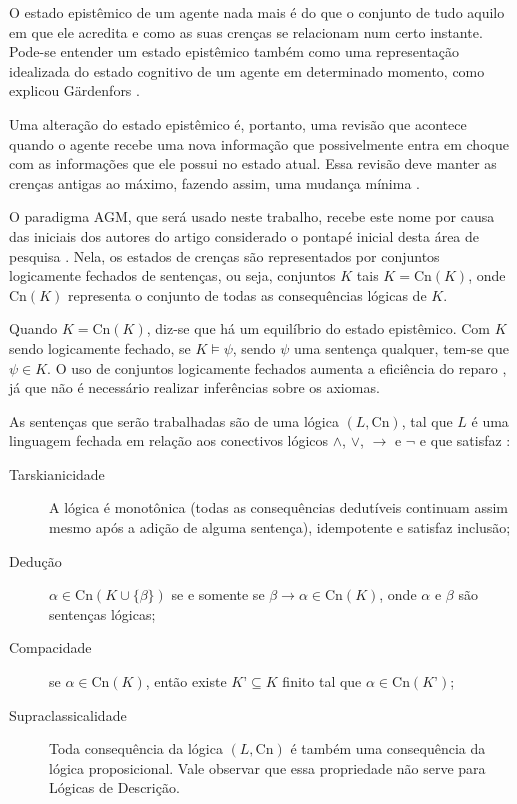 O estado epistêmico de um agente nada mais é do que o conjunto de tudo aquilo em que ele acredita e como as suas crenças se relacionam num certo instante. Pode-se entender um estado epistêmico também como uma representação idealizada do estado cognitivo de um agente em determinado momento, como explicou Gärdenfors \citep{revisaoGardenfors}.

Uma alteração do estado epistêmico é, portanto, uma revisão que acontece quando o agente recebe uma nova informação que possivelmente entra em choque com as informações que ele possui no estado atual. Essa revisão deve manter as crenças antigas ao máximo, fazendo assim, uma mudança mínima \citep{revisaoGardenfors}.

O paradigma AGM, que será usado neste trabalho, recebe este nome por causa das iniciais dos autores do artigo considerado o pontapé inicial desta área de pesquisa  \citep{revisaoAGM}. Nela, os estados de crenças são representados por conjuntos logicamente fechados de sentenças, ou seja, conjuntos $ K $ tais $ K = \text{Cn}(K) $, onde $ \text{Cn}(K) $ representa o conjunto de todas as consequências lógicas de $ K $. 

Quando $ K = \text{Cn}(K) $, diz-se que há um equilíbrio do estado epistêmico. Com $ K $ sendo logicamente fechado, se $ K \models \psi $, sendo $ \psi $ uma sentença qualquer, tem-se que $ \psi \in K $. O uso de conjuntos logicamente fechados aumenta a eficiência do reparo \citep{revisaoHansson}, já que não é necessário realizar inferências sobre os axiomas.

As sentenças que serão trabalhadas são de uma lógica $ (L, \text{Cn}) $, tal que $ L $ é uma linguagem fechada em relação aos conectivos lógicos $ \land $, $ \lor $, $ \to $ e $ \lnot $ e que satisfaz \citep{revisaoRibeiro}:

\begin{description}
	\item[Tarskianicidade] A lógica é monotônica (todas as consequências dedutíveis continuam assim mesmo após a adição de alguma sentença), idempotente e satisfaz inclusão;
	\item[Dedução] $ \alpha \in \text{Cn}(K \cup \{\beta\}) $ se e somente se $ \beta \to \alpha \in \text{Cn}(K) $, onde $ \alpha $ e $ \beta $ são sentenças lógicas;
	\item[Compacidade] se $ \alpha \in \text{Cn}(K) $, então existe $ K’ \subseteq K $ finito tal que $ \alpha \in \text{Cn}(K’) $;
	\item[Supraclassicalidade] Toda consequência da lógica $ (L, \text{Cn}) $ é também uma consequência da lógica proposicional. Vale observar que essa propriedade não serve para Lógicas de Descrição.
\end{description} 

